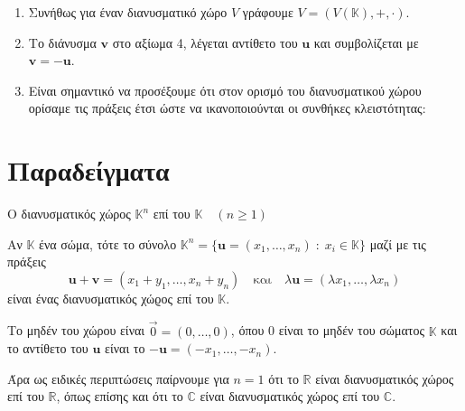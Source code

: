 \begin{rem}
\item {}
    \begin{enumerate}
        \item Συνήθως για έναν διανυσματικό χώρο $V$ γράφουμε 
            $V = (V(\mathbb{K}), +, \cdot) $.
        \item Το διάνυσμα $ \mathbf{v} $ στο αξίωμα 4, λέγεται 
            \textcolor{Col2}{αντίθετο} του $ \mathbf{u} $ και συμβολίζεται με 
            $ \mathbf{v} = - \mathbf{u} $.
        \item Είναι σημαντικό να προσέξουμε ότι στον ορισμό του διανυσματικού χώρου 
            ορίσαμε τις πράξεις έτσι ώστε να ικανοποιούνται οι συνθήκες κλειστότητας:
    \end{enumerate}
\end{rem}


\section{Παραδείγματα}
\begin{example} \label{ex:Rn}
    \textcolor{Col2}{Ο διανυσματικός χώρος $ \mathbb{K}^{n} $ 
    επί του $ \mathbb{K} \quad (n \geq 1) $}

    Αν $ \mathbb{K} $ ένα σώμα, τότε το σύνολο $ \mathbb{K}^{n} = 
    \{ \mathbf{u} = (x_{1},\ldots,x_{n}) \; : \; x_{i} \in \mathbb{K}\} $ 
    μαζί με τις πράξεις 
    \[
        \mathbf{u}+ \mathbf{v} = (x_{1}+ y_{1}, \ldots , x_{n}+y_{n}) 
        \quad \text{και} \quad \lambda \mathbf{u} = 
        ( \lambda x_{1}, \ldots, \lambda x_{n})
    \]
    είναι ένας διανυσματικός χώϱος επί του $ \mathbb{K} $. 

    Το μηδέν του χώρου 
    είναι $ \vec{0} = (0,\ldots,0) $, όπου 0 είναι το μηδέν του σώματος 
    $ \mathbb{K} $ και το αντίθετο του $ \mathbf{u} $ είναι το $ - \mathbf{u} =
    (- x_{1}, \ldots, - x_{n}) $.

    Άρα ως ειδικές περιπτώσεις παίρνουμε για $ n=1 $ ότι το $ \mathbb{R} $ 
    είναι διανυσματικός χώρος επί του $ \mathbb{R} $, όπως επίσης και ότι το 
    $ \mathbb{C} $ είναι διανυσματικός χώρος επί του $ \mathbb{C} $.
\end{example} 

